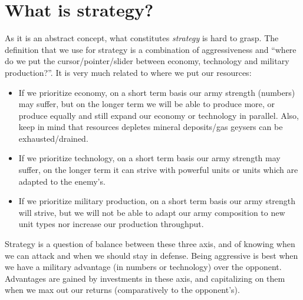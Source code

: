 \section{What is strategy?}


As it is an abstract concept, what constitutes \textit{strategy} is hard to grasp. The definition that we use for strategy is a combination of aggressiveness and ``where do we put the cursor/pointer/slider between economy, technology and military production?''. It is very much related to where we put our resources:
\begin{itemize}
    \item If we prioritize economy, on a short term basis our army strength (numbers) may suffer, but on the longer term we will be able to produce more, or produce equally and still expand our economy or technology in parallel. Also, keep in mind that resources depletes mineral deposits/gas geysers can be exhausted/drained.
    \item If we prioritize technology, on a short term basis our army strength may suffer, on the longer term it can strive with powerful units or units which are adapted to the enemy's.
    \item If we prioritize military production, on a short term basis our army strength will strive, but we will not be able to adapt our army composition to new unit types nor increase our production throughput.
\end{itemize}
Strategy is a question of balance between these three axis, and of knowing when we can attack and when we should stay in defense. Being aggressive is best when we have a military advantage (in numbers or technology) over the opponent. Advantages are gained by investments in these axis, and capitalizing on them when we max out our returns (comparatively to the opponent's).

